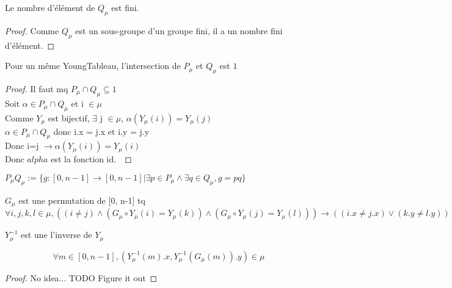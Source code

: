 \begin{definition}[QuCard]
    \label{QuCard}
    \leanok
    Le nombre d'élément de $Q_{\mu}$ est fini.
\end{definition}
\begin{proof}
    \leanok
    Comme $Q_{\mu}$ est un sous-groupe d'un groupe fini, il a un nombre fini d'élément.
\end{proof}

\begin{lemma}[sectPuQu]
    \label{sectPuQu}
    \leanok
    Pour un même YoungTableau, l'intersection de $P_{\mu}$ et $Q_{\mu}$ est ${1}$
\end{lemma}
\begin{proof}
    \leanok
    Il faut mq $P_{\mu} \cap Q_{\mu} \subseteq {1}$\\
    Soit $\alpha \in P_{\mu} \cap Q_{\mu}$ et i $\in \mu$\\
    Comme $Y_{\mu}$ est bijectif, $\exists$ j $\in \mu$, $\alpha ( Y_{\mu} (i)) = Y_{\mu} (j)$\\
    $\alpha \in P_{\mu} \cap Q_{\mu}$ donc i.x = j.x et i.y = j.y\\
    Donc i=j $\to \alpha(Y_{\mu}(i))=Y_{\mu}(i)$\\
    Donc $alpha$ est la fonction id.\
\end{proof}

\begin{definition}[PuQu]
    \label{PuQu}
    \leanok
    $P_{\mu}Q_{\mu} := \{g : [0,n-1] \to [0,n-1] | \exists p \in P_{\mu} \land \exists q \in Q_{\mu}, g = p q \}$
\end{definition}

\begin{definition}[Gu]
    \label{Gu}
    \leanok
    $G_{\mu}$ est une permutation de [0, n-1] tq
    \[ \forall i,j,k,l \in \mu, ((i \neq j) \land (G_{\mu} \circ Y_{\mu} (i) = Y_{\mu} (k)) \land (G_{\mu} \circ Y_{\mu} (j) = Y_{\mu} (l))) → ((i.x \neq j.x) \lor (k.y \neq l.y)) \]
\end{definition}

\begin{definition}[YuInv]
    \label{YuInv}
    \leanok
    $Y_{\mu}^{-1}$ est une l'inverse de $Y_{\mu}$
\end{definition}

\begin{lemma}[staysInY]
    \label{staysInY}
    \leanok
    \[ \forall m \in [0,n-1], (Y_{\mu}^{-1}(m).x,Y_{\mu}^{-1}(G_{\mu}(m)).y) \in \mu \]
\end{lemma}
\begin{proof}
    No idea...
    TODO Figure it out
\end{proof}

